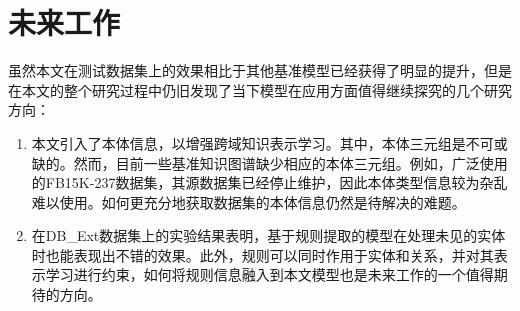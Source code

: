\section{未来工作}
虽然本文在测试数据集上的效果相比于其他基准模型已经获得了明显的提升，但是在本文的整个研究过程中仍旧发现了当下模型在应用方面值得继续探究的几个研究方向：
\begin{enumerate}[label=\arabic*)]
  \item 本文引入了本体信息，以增强跨域知识表示学习。其中，本体三元组是不可或缺的。然而，目前一些基准知识图谱缺少相应的本体三元组。例如，广泛使用的FB15K-237数据集，其源数据集已经停止维护，因此本体类型信息较为杂乱难以使用。如何更充分地获取数据集的本体信息仍然是待解决的难题。
  \item 在DB\_Ext数据集上的实验结果表明，基于规则提取的模型在处理未见的实体时也能表现出不错的效果。此外，规则可以同时作用于实体和关系，并对其表示学习进行约束，如何将规则信息融入到本文模型也是未来工作的一个值得期待的方向。
\end{enumerate}